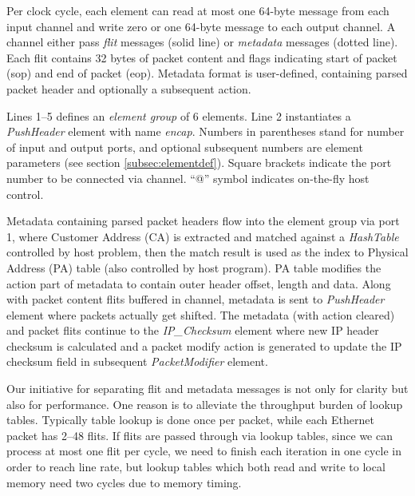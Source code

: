 Per clock cycle, each element can read at most one 64-byte message from each input channel and write zero or one 64-byte message to each output channel. A channel either pass \textit{flit} messages (solid line) or \textit{metadata} messages (dotted line). Each flit contains 32 bytes of packet content and flags indicating start of packet (sop) and end of packet (eop). Metadata format is user-defined, containing parsed packet header and optionally a subsequent action.

Lines 1--5 defines an \textit{element group} of 6 elements. Line 2 instantiates a \textit{PushHeader} element with name \textit{encap}. Numbers in parentheses stand for number of input and output ports, and optional subsequent numbers are element parameters (see section \ref{subsec:elementdef}). Square brackets indicate the port number to be connected via channel. ``@'' symbol indicates on-the-fly host control.

Metadata containing parsed packet headers flow into the element group via port 1, where Customer Address (CA) is extracted and matched against a \textit{HashTable} controlled by host problem, then the match result is used as the index to Physical Address (PA) table (also controlled by host program). PA table modifies the action part of metadata to contain outer header offset, length and data. Along with packet content flits buffered in channel, metadata is sent to \textit{PushHeader} element where packets actually get shifted. The metadata (with action cleared) and packet flits continue to the \textit{IP\_Checksum} element where new IP header checksum is calculated and a packet modify action is generated to update the IP checksum field in subsequent \textit{PacketModifier} element.

Our initiative for separating flit and metadata messages is not only for clarity but also for performance. One reason is to alleviate the throughput burden of lookup tables. Typically table lookup is done once per packet, while each Ethernet packet has 2--48 flits. If flits are passed through via lookup tables, since we can process at most one flit per cycle, we need to finish each iteration in one cycle in order to reach line rate, but lookup tables which both read and write to local memory need two cycles due to memory timing.

